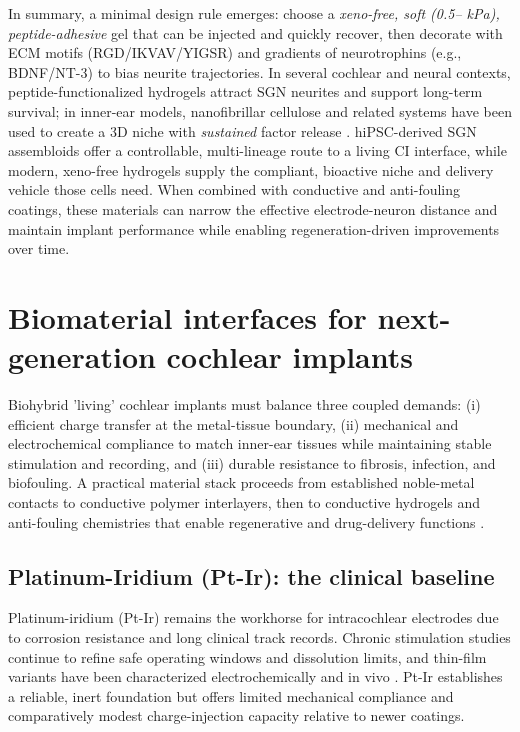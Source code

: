 \documentclass[referee,pdflatex, sn-vancouver-num]{sn-jnl}%
\theoremstyle{thmstyleone}%
\theoremstyle{thmstyletwo}%
\theoremstyle{thmstylethree}%
\DeclareRobustCommand{\textendash}{\ifmmode\text{-}\else\leavevmode\hbox{--}\fi}
\begin{document}
In summary, a minimal design rule emerges: choose a \emph{xeno-free, soft (0.5\textendash3 kPa), peptide-adhesive} gel that can be injected and quickly recover, then decorate with ECM motifs (RGD/IKVAV/YIGSR) and gradients of neurotrophins (e.g., BDNF/NT-3) to bias neurite trajectories. In several cochlear and neural contexts, peptide-functionalized hydrogels attract SGN neurites and support long-term survival; in inner-ear models, nanofibrillar cellulose and related systems have been used to create a 3D niche with \emph{sustained} factor release \citep{Pancratov2017ColSurfB,Chang2020ActaBiomaterialia}.  hiPSC-derived SGN assembloids offer a controllable, multi-lineage route to a living CI interface, while modern, xeno-free hydrogels supply the compliant, bioactive niche and delivery vehicle those cells need. When combined with conductive and anti-fouling coatings, these materials can narrow the effective electrode-neuron distance and maintain implant performance while enabling regeneration-driven improvements over time.

\section{Biomaterial interfaces for next-generation cochlear implants}\label{sec5}
Biohybrid 'living' cochlear implants must balance three coupled demands: (i) efficient charge transfer at the metal-tissue boundary, (ii) mechanical and electrochemical compliance to match inner-ear tissues while maintaining stable stimulation and recording, and (iii) durable resistance to fibrosis, infection, and biofouling. A practical material stack proceeds from established noble-metal contacts to conductive polymer interlayers, then to conductive hydrogels and anti-fouling chemistries that enable regenerative and drug-delivery functions \cite{CarnicerLombarte2024AdvMat}.

\subsection{Platinum-Iridium (Pt-Ir): the clinical baseline}
Platinum-iridium (Pt-Ir) remains the workhorse for intracochlear electrodes due to corrosion resistance and long clinical track records. Chronic stimulation studies continue to refine safe operating windows and dissolution limits, and thin-film variants have been characterized electrochemically and in vivo \cite{Shepherd2020,Dalrymple2020}. Pt-Ir establishes a reliable, inert foundation but offers limited mechanical compliance and comparatively modest charge-injection capacity relative to newer coatings.
\end{document}
